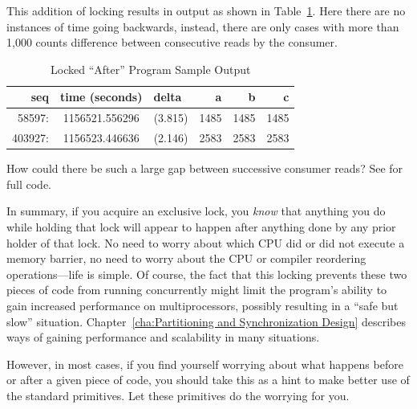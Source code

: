 This addition of locking results in output as shown in
Table~\ref{fig:app:questions:Locked After Program Sample Output}.
Here there are no instances of time going backwards, instead,
there are only cases with more than 1,000 counts difference between
consecutive reads by the consumer.

\begin{table}[htbp]
\centering
\scriptsize
\begin{tabular}{rcrrrr}
seq    & time (seconds) & delta~    &  a &  b &  c \\
\hline
58597:  & 1156521.556296 & (3.815) & 1485 & 1485 & 1485 \\
403927: & 1156523.446636 & (2.146) & 2583 & 2583 & 2583 \\
\end{tabular}
\caption{Locked ``After'' Program Sample Output}
\label{fig:app:questions:Locked After Program Sample Output}
\end{table}

\QuickQuiz{}
	How could there be such a large gap between successive
	consumer reads?
	See  for full code.
 \QuickQuizEnd

In summary, if you acquire an exclusive lock, you {\em know} that
anything you do while holding that lock will appear to happen after
anything done by any prior holder of that lock.
No need to worry about which CPU did or did not execute a memory
barrier, no need to worry about the CPU or compiler reordering
operations---life is simple.
Of course, the fact that this locking prevents these two pieces of
code from running concurrently might limit the program's ability
to gain increased performance on multiprocessors, possibly resulting
in a ``safe but slow'' situation.
Chapter~\ref{cha:Partitioning and Synchronization Design} describes ways of
gaining performance and scalability in many situations.

However, in most cases, if you find yourself worrying about what happens
before or after a given piece of code, you should take this as a hint to
make better use of the standard primitives.
Let these primitives do the worrying for you.
